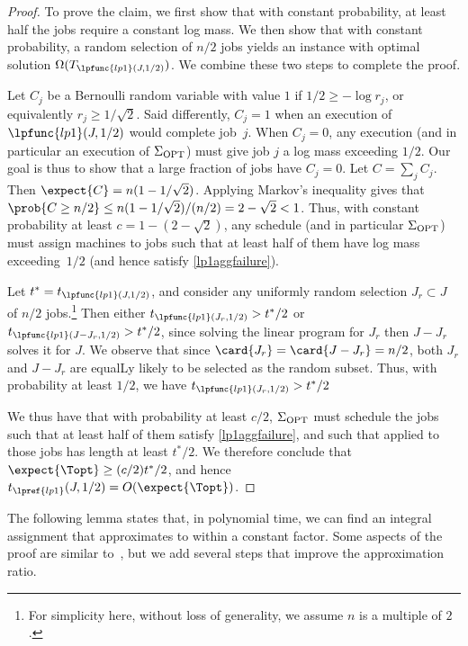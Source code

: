{\begin{proof}
{  To prove the claim, we first show that with constant probability, at
  least half the jobs require a constant log mass.  We then show that
  with constant probability, a random selection of $n/2$ jobs yields
  an  instance with optimal solution
  $\Omega(T_{\lpfunc{lp1}(J,1/2)})$.  We combine these two steps to
  complete the proof.
  
  Let $C_j$ be a Bernoulli random variable with value $1$ if $1/2 \geq
  -\log r_j$, or equivalently $r_j \geq 1/\sqrt{2}$.  Said
  differently, $C_j=1$ when an execution of $\lpfunc{lp1}(J,1/2)$
  would complete job~$j$.  When $C_j=0$, any execution (and in
  particular an execution of $\Sigma_{\rm OPT}$) must give job $j$ a
  log mass exceeding $1/2$.  Our goal is thus to show that a large
  fraction of jobs have $C_j=0$.  Let $C = \sum_j C_j$.  Then $\expect{C} =
  n(1-1/\sqrt{2})$.  Applying Markov's inequality gives that $\prob{C
    \geq n/2} \leq n(1-1/\sqrt{2})/(n/2) = 2-\sqrt{2} < 1$.  Thus,
  with constant probability at least $c=1-(2-\sqrt{2})$, any schedule
  (and in particular $\Sigma_{\rm OPT}$) must assign machines to jobs
  such that at least half of them have log mass exceeding~$1/2$ (and
  hence satisfy \eqref{lp1aggfailure}).
  
  Let $t^* = t_{\lpfunc{lp1}(J,1/2)}$, and consider any uniformly
  random selection $J_r\subset J$ of $n/2$ jobs.\footnote{For
    simplicity here, without loss of generality, we assume $n$ is a
    multiple of $2$.}  Then either $t_{\lpfunc{lp1}(J_r,1/2)} > t^*/2$
  or $t_{\lpfunc{lp1}(J-J_r,1/2)} > t^*/2$, since solving the linear
  program for $J_r$ then $J-J_r$ solves it for $J$.  We observe that
  since $\card{J_r} = \card{J-J_r} = n/2$, both $J_r$ and $J-J_r$ are
  equalLy likely to be selected as the random subset.  Thus, with
  probability at least $1/2$, we have $t_{\lpfunc{lp1}(J_r,1/2)} > t^*/2$
  
  We thus have that with probability at least $c/2$, $\Sigma_{\rm
    OPT}$ must schedule the jobs such that at least half of them
  satisfy \eqref{lp1aggfailure}, and such that  applied to
  those jobs has length at least $t^*/2$.  We therefore conclude that
  $\expect{\Topt} \geq (c/2) t^*/2$, and hence $t_{\lpref{lp1}}(J,1/2) =
  O(\expect{\Topt})$.
}
\end{proof}
}

The following lemma states that, in polynomial time, we can find an integral
assignment that approximates  to within a constant factor.
Some aspects of the proof are similar to~\cite[Theorem 4.1]{LinRa07},
 but we add several steps  that improve the
approximation ratio.  

